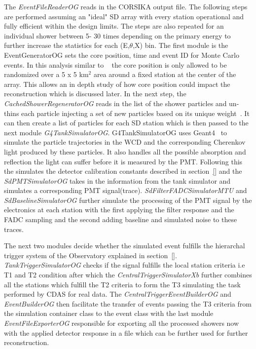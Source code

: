 The \textit{EventFileReaderOG} reads in the CORSIKA output file. The following steps are performed assuming an "ideal" SD array with every station operational and fully efficient within the design limits. The steps are also repeated for an individual shower between 5- 30 times depending on the primary energy to further increase the statistics for each (E,$\theta$,X) bin. The first module is the EventGeneratorOG sets the core position, time and event ID for Monte Carlo events. In this analysis similar to ~\cite{} the core position is only allowed to be randomized over a 5 x 5 km$^2$ area around a fixed station at the center of the array. This allows an in depth study of how core position could impact the reconstruction which is discussed later. In the next step, the \textit{CachedShowerRegeneratorOG} reads in the list of the shower particles and un-thins each particle injecting a set of new particles based on its unique weight~\cite{}. It can then create a list of particles for each SD station which is then passed to the next module \textit{G4TankSimulatorOG}. G4TankSimulatorOG uses Geant4~\cite{} to simulate the particle trajectories in the WCD and the corresponding Cherenkov light produced by these particles. It also handles all the possible absorption and reflection the light can suffer before it is measured by the PMT. Following this the \textit{} simulates the detector calibration constants described in section~\ref{} and the \textit{SdPMTSimulatorOG} takes in the information from the tank simulator and simulates a corresponding PMT signal(trace). \textit{SdFilterFADCSimulatorMTU} and \textit{SdBaselineSimulatorOG} further simulate the processing of the PMT signal by the electronics at each station with the first applying the filter response and the FADC sampling and the second adding baseline and simulated noise to these traces. 

The next two modules decide whether the simulated event fulfills the hierarchal trigger system of the Observatory explained in section~\ref{}. \textit{TankTriggerSimulatorOG} checks if the signal fulfills the local station criteria i.e T1 and T2 condition after which the \textit{CentralTriggerSimulatorXb} further combines all the stations which fulfill the T2 criteria to form the T3 simulating the task performed by CDAS for real data. The \textit{CentralTriggerEventBuilderOG} and \textit{EventBuilderOG} then facilitate the transfer of events passing the T3 criteria from the simulation container class to the event class with the last module \textit{EventFileExporterOG} responsible for exporting all the processed showers now with the applied detector response in a file which can be further used for further reconstruction.  


